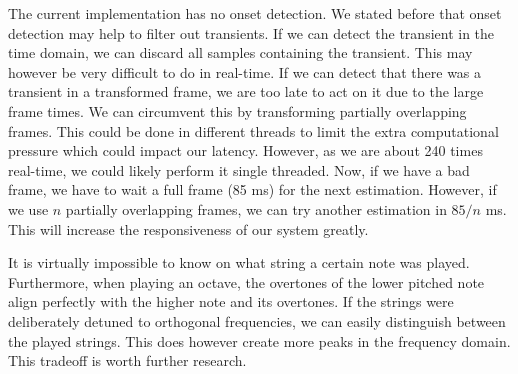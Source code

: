 \documentclass[10pt,twocolumn]{article}
\begin{document}
The current implementation has no onset detection. We stated before that onset detection may help to filter out transients. If we can detect the transient in the time domain, we can discard all samples containing the transient. This may however be very difficult to do in real-time. If we can detect that there was a transient in a transformed frame, we are too late to act on it due to the large frame times. We can circumvent this by transforming partially overlapping frames. This could be done in different threads to limit the extra computational pressure which could impact our latency. However, as we are about 240 times real-time, we could likely perform it single threaded. Now, if we have a bad frame, we have to wait a full frame (85 ms) for the next estimation. However, if we use $n$ partially overlapping frames, we can try another estimation in $85/n$ ms. This will increase the responsiveness of our system greatly.

It is virtually impossible to know on what string a certain note was played. Furthermore, when playing an octave, the overtones of the lower pitched note align perfectly with the higher note and its overtones. If the strings were deliberately detuned to orthogonal frequencies, we can easily distinguish between the played strings. This does however create more peaks in the frequency domain. This tradeoff is worth further research.





\end{document}
